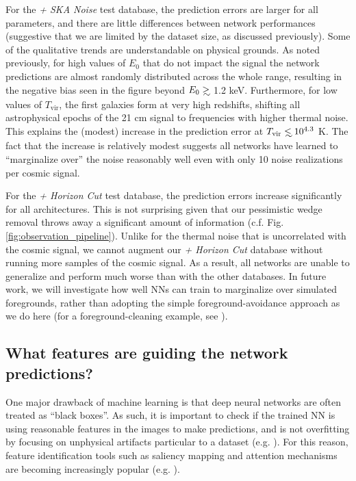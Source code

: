 \documentclass[fleqn,usenatbib]{mnras}
\newcommand\lsim{\mathrel{\rlap{\lower4pt\hbox{\hskip1pt$\sim$}}
        \raise1pt\hbox{$<$}}}
\newcommand\gsim{\mathrel{\rlap{\lower4pt\hbox{\hskip1pt$\sim$}}
        \raise1pt\hbox{$>$}}}
\begin{document}
For the \textit{+ SKA Noise} test database, the prediction errors are larger for all parameters, and there are little differences between network performances (suggestive that we are limited by the dataset size, as discussed previously).  Some of the qualitative trends are understandable on physical grounds.  As noted previously, for high values of $E_0$ that do not impact the signal the network predictions are almost randomly distributed across the whole range, resulting in the negative bias seen in the figure beyond $E_0\gsim$ 1.2 keV. Furthermore, for low values of $T_{\mathrm{vir}}$, the first galaxies form at very high redshifts, shifting all astrophysical epochs of the 21 cm signal to frequencies with higher thermal noise.  This explains the (modest) increase in the prediction error at $T_{\rm vir} \lsim 10^{4.3}$ K.  The fact that the increase is relatively modest suggests all networks have learned to \enquote{marginalize over} the noise reasonably well even with only 10 noise realizations per cosmic signal.

For the \textit{+ Horizon Cut} test database, the prediction errors increase significantly for all architectures.  This is not surprising given that our pessimistic wedge removal throws away a significant amount of information (c.f. Fig. \ref{fig:observation_pipeline}).  Unlike for the thermal noise that is uncorrelated with the cosmic signal, we cannot augment our \textit{+ Horizon Cut} database without running more samples of the cosmic signal.  As a result, all networks are unable to generalize and perform much worse than with the other databases.  In future work, we will investigate how well NNs can train to marginalize over simulated foregrounds, rather than adopting the simple foreground-avoidance approach as we do here (for a foreground-cleaning example, see \citealt{21cm_ML_LaPlante19}).

\subsection{What features are guiding the network predictions?} \label{subsec:visualization}

One major drawback of machine learning is that deep neural networks are often treated as \enquote{black boxes}.  As such, it is important to check if the trained NN is using reasonable features in the images to make predictions, and is not overfitting by focusing on unphysical artifacts particular to a dataset (e.g. \citealt{lapuschkin2019unmasking}).  For this reason, feature identification tools such as saliency mapping and attention mechanisms are becoming increasingly popular (e.g. \citealt{zeiler2014visualizing,selvaraju2017grad,chang2018explaining,vaswani2017attention,ramachandran2019stand}).
\end{document}
